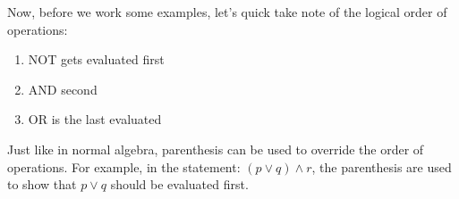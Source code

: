\documentclass[addpoints]{exam}
\begin{document}
Now, before we work some examples, let's quick take note of the logical order of operations:

\begin{tcolorbox}[title= LOGICAL ORDER OF OPERATIONS,colframe=black,sharp corners,colback=white,colbacktitle=white,coltitle=black]
  \begin{enumerate}
    \item NOT gets evaluated first 
    \item AND second 
    \item OR is the last evaluated
  \end{enumerate}
  Just like in normal algebra, parenthesis can be used to override the order of operations. For example, in the statement: $(p \lor q) \land r$, the parenthesis are used to show that $p \lor q$ should be evaluated first.
\end{tcolorbox}
\end{document}
